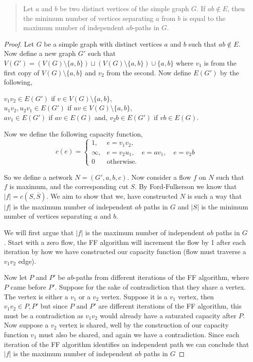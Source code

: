 \documentclass[12pt]{article}
\begin{document}
\begin{enumerate}
\begin{quote}
Let $a$ and $b$ be two distinct vertices of the simple graph $G$. If $ab \not \in E$, then the minimum number of vertices separating $a$ from $b$ is equal to the maximum number of independent $ab$-paths in $G.$
\end{quote}
\begin{proof} Let $G$ be a simple graph with distinct vertices $a$ and $b$ such that $ab \not \in E$. Now define a new graph $G'$ such that $V(G') = \left(V(G)\setminus\{a, b\}\right) \sqcup \left(V(G)\setminus\{a, b\}\right) \cup \{a, b\}$ where $v_1$ is from the first copy of $V(G)\setminus\{a, b\}$ and $v_2$ from the second. Now define $E(G')$ by the following, 
	\begin{center}
		$v_1v_2 \in E(G')$ if $v \in V(G)\setminus\{a, b\}$, \\
		$u_1v_2, u_2v_1 \in E(G')$ if $uv \in V(G)\setminus\{a, b\}$,\\ 
		$av_1 \in E(G')$ if $av \in E(G)$ and, $v_2b \in E(G')$ if $vb \in E(G)$. 
	\end{center}

	Now we define the following capacity function, 
	\begin{equation*}
		c(e) = \begin{cases}
			1, & e = v_1v_2,\\
			\infty, & e = v_2u_1, \quad e= av_1, \quad e = v_2b\\
			0& \text{otherwise}.
		\end{cases}
	\end{equation*}

So we define a network $N = (G', a, b, c)$. Now consider a flow $f$ on $N$ such that $f$ is maximum, and the corresponding cut $S$. By Ford-Fulkerson we know that $|f| = c(S, \overline{S})$. We aim to show that we, have constructed $N$ is such a way that $|f|$ is the maximum number of independent $ab$ paths in $G$ and $|S|$ is the minimum number of vertices separating $a$ and $b$. 

We will first argue that $|f|$ is the maximum number of independent $ab$ paths in $G$.
Start with a zero flow, the FF algorithm will increment the flow by 1 after each iteration by how we have constructed our capacity function (flow must traverse a $v_1v_2$ edge).

Now let $P$ and $P'$ be $ab$-paths from different iterations of the FF algorithm, where $P$ came before $P'$. Suppose for the sake of contradiction that they share a vertex. The vertex is either a $v_1$ or a $v_2$ vertex. Suppose it is a $v_1$ vertex, then $v_1v_2 \in P, P'$ but since $P$ and $P'$ are different iterations of the FF algorithm, this must be a contradiction as $v_1v_2$ would already have a saturated capacity after $P$. Now suppose a $v_2$ vertex is shared, well by the construction of our capacity function $v_1$ must also be shared, and again we have a contradiction. Since each iteration of the FF algorithm identifies an independent path we can conclude that $|f|$ is the maximum number of independent $ab$ paths in $G$



\end{proof}
\end{enumerate}
\end{document}
